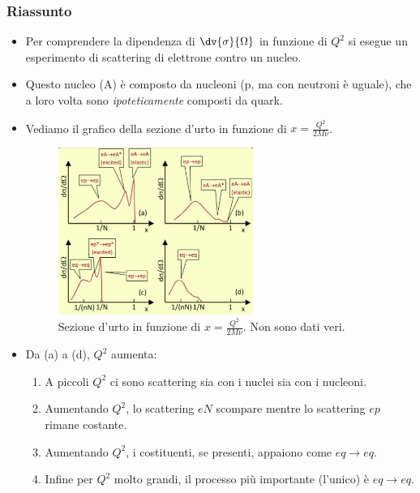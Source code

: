 \subsubsection{Riassunto}
\begin{itemize}
    \item Per comprendere la dipendenza di $\dv{\sigma}{\Omega}$ in funzione di $Q^2$ si esegue un esperimento di scattering di elettrone contro un nucleo.
    \item Questo nucleo (A) è composto da nucleoni (p, ma con neutroni è uguale), che a loro volta sono \textit{ipoteticamente} composti da quark.
    \item Vediamo il grafico della sezione d'urto in funzione di $x=\frac{Q^2}{2M\nu}$.
    \begin{figure}[H]
        \centering
        \includegraphics[width=0.6\textwidth]{immagini/fig_sez_urto_x.png}
        \caption{Sezione d'urto in funzione di $x=\frac{Q^2}{2M\nu}$. Non sono dati veri.}
    \end{figure}
    \item Da (a) a (d), $Q^2$ aumenta:
    \begin{enumerate}[label=(\alph*)]
        \item A piccoli $Q^2$ ci sono scattering sia con i nuclei sia con i nucleoni.
        \item Aumentando $Q^2$, lo scattering $eN$ scompare mentre lo scattering $ep$ rimane costante.
        \item Aumentando $Q^2$, i costituenti, se presenti, appaiono come $eq\to eq$.
        \item Infine per $Q^2$ molto grandi, il processo più importante (l'unico) è $eq\to eq$.
    \end{enumerate}
\end{itemize}
